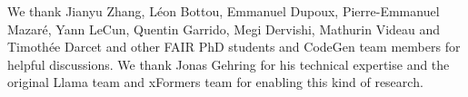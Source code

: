 We thank Jianyu Zhang, Léon Bottou, Emmanuel Dupoux, Pierre-Emmanuel Mazaré, Yann LeCun, Quentin Garrido, Megi Dervishi, Mathurin Videau and Timothée Darcet and other FAIR PhD students and CodeGen team members for helpful discussions. We thank Jonas Gehring for his technical expertise and the original Llama team and xFormers team for enabling this kind of research.
